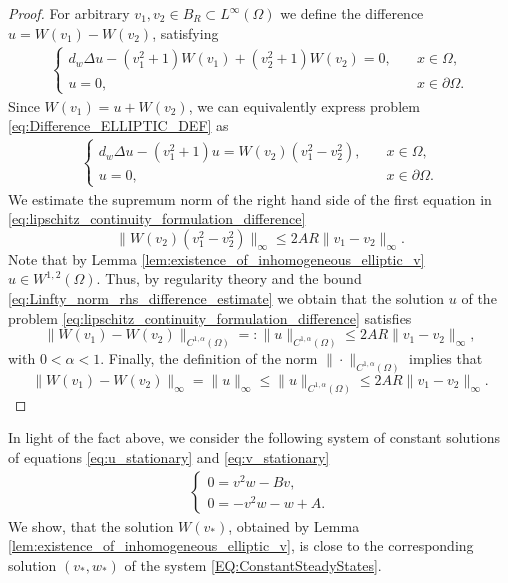 \documentclass[11pt, a4paper]{article}
\theoremstyle{break}
\theoremstyle{break}
\theoremstyle{break}
\theoremstyle{break}
\theoremstyle{break}
\theoremstyle{break}
\theoremstyle{break}
\theoremstyle{break}
\theoremstyle{break}
\begin{document}
\begin{proof}
    For arbitrary $v_1, v_2 \in B_R \subset L^\infty(\Omega)$ we define the difference $u = W(v_1) - W(v_2)$, satisfying 
    \begin{align}
        \label{eq:Difference_ELLIPTIC_DEF}
        \begin{cases}
            d_w\Delta u - (v_1^2 + 1) W(v_1) + (v_2^2 + 1) W(v_2) = 0, &\quad x \in \Omega, \\
            u = 0, &\quad x \in \partial\Omega.
        \end{cases}
    \end{align}
    Since $W(v_1) = u + W(v_2)$, we can equivalently express problem \eqref{eq:Difference_ELLIPTIC_DEF} as
    \begin{align}
        \label{eq:lipschitz_continuity_formulation_difference}
        \begin{cases}
            d_w\Delta u - (v_1^2 + 1) u  = W(v_2) (v_1^2 - v_2^2), &\quad x \in \Omega, \\
            u = 0, &\quad x \in \partial\Omega.
        \end{cases}
    \end{align}
    We estimate the supremum norm of the right hand side of the first equation in  \eqref{eq:lipschitz_continuity_formulation_difference}
    \begin{equation}
        \label{eq:Linfty_norm_rhs_difference_estimate}
        \|W(v_2) (v_1^2-v_2^2)\|_\infty \leq 2AR\|v_1-v_2\|_\infty.
    \end{equation}
    Note that by Lemma \ref{lem:existence_of_inhomogeneous_elliptic_v} $u \in W^{1,2}(\Omega)$. Thus, by regularity theory \cite[Theorems 8.33 and 8.34]{gilbarg2001elliptic} and the bound \eqref{eq:Linfty_norm_rhs_difference_estimate} we obtain that the solution $u$ of the problem \eqref{eq:lipschitz_continuity_formulation_difference} satisfies
    \begin{equation}
        \|W(v_1) - W(v_2)\|_{C^{1, \alpha}(\Omega)} =: \|u\|_{C^{1, \alpha}(\Omega)}  \leq 2AR\|v_1-v_2\|_\infty,
    \end{equation}
    with $0 < \alpha < 1$. Finally, the definition of the norm $\|\cdot\|_{C^{1,\alpha}(\Omega)}$ implies that 
    \begin{equation}
        \|W(v_1) - W(v_2)\|_\infty = \|u\|_\infty \leq \|u\|_{C^{1, \alpha}(\Omega)}  \leq 2AR\|v_1-v_2\|_\infty.
    \end{equation}
\end{proof}
In light of the fact above, we consider the following system of constant solutions of equations \eqref{eq:u_stationary} and \eqref{eq:v_stationary}
\begin{align}
    \label{EQ:ConstantSteadyStates}
    \begin{cases}
        0 = v^2w - Bv,\\
        0 = -v^2w - w + A.
    \end{cases}
\end{align}
We show, that the solution $W(v_*)$, obtained by Lemma \ref{lem:existence_of_inhomogeneous_elliptic_v}, is close to the corresponding solution $(v_*, w_*)$ of the system \eqref{EQ:ConstantSteadyStates}. 
\end{document}
